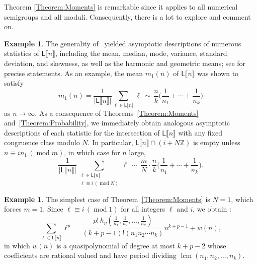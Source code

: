 \documentclass[10pt,reqno]{amsart}
\newcommand{\ZZ}{\mathbb{Z}}
\newcommand{\Le}{\mathsf{L}}
\newcommand{\lcm}{\operatorname{lcm}}
\providecommand{\multi}[1]{\llbracket #1 \rrbracket}
\newcommand{\0}{\color{lightgray}0}
\renewcommand{\pmod}[1]{\,(\operatorname{mod} #1)}
\renewcommand\>{\rangle}
\newcommand\<{\langle}
\theoremstyle{plain}
\theoremstyle{definition}
\newtheorem{Example}[equation]{Example}
\begin{document}
Theorem \ref{Theorem:Moments} is remarkable since it applies to all numerical semigroups
and all moduli.  Consequently, there is a lot to explore and comment on.

\begin{Example}
The generality of~\cite[Thm.~1 and~2]{GOOY} yielded asymptotic descriptions of numerous statistics of $\Le\multi{n}$, including the mean, median, mode, variance, standard deviation, and skewness, as well as the harmonic and geometric means; see \cite[Section~2.1]{GOOY} for precise statements.  As an example, the mean $m_1(n)$ of $\Le\multi{n}$ was shown to satisfy
\begin{equation*}
m_1(n) = \frac{1}{|\Le\multi{n}|}\sum_{\ell \in \Le\multi{n}} \ell
\,\sim\,
\frac{n}{k}\bigg(\frac{1}{n_1} + \cdots + \frac{1}{n_k}\bigg)
\end{equation*}
as $n \to \infty$.  
As a consequence of Theorems~\ref{Theorem:Moments} and~\ref{Theorem:Probability}, we immediately obtain analogous asymptotic descriptions of each statistic for the intersection of $\Le\multi{n}$ with any fixed congruence class modulo $N$.  In particular, $\Le\multi{n} \cap (i + N\ZZ)$ is empty unless $n \equiv in_1 \pmod m$, in which case for $n$ large,
\begin{equation*}
\frac{1}{|\Le\multi{n}|}\sum_{\substack{\ell \in \Le\multi{n} \\ \ell \equiv i \pmod{N}}} \ell
\,\sim\,
\frac{m}{N} \cdot \frac{n}{k}\bigg(\frac{1}{n_1} + \cdots + \frac{1}{n_k}\bigg).
\end{equation*}
\end{Example}

\begin{Example}
The simplest case of Theorem~\ref{Theorem:Moments} is $N = 1$, which forces $m=1$.  Since $\ell \equiv i \pmod{1}$ for all 
integers $\ell$ and $i$, we obtain \cite[Thm.~2]{GOOY}:
\begin{equation}\label{eq:GOOY}
\sum_{\ell \in \Le\multi{n}} \ell^p = 
 \dfrac{p! \, h_p ( \frac{1}{n_1}, \frac{1}{n_2}, \ldots, \frac{1}{n_k} )}{(k + p - 1)! (n_1 n_2 \cdots n_k)}  n^{k+p-1} + w(n),
\end{equation}
in which $w(n)$ is a quasipolynomial of degree at most $k+p-2$ whose coefficients are rational valued and have period dividing $\lcm(n_1,n_2,\ldots,n_k)$.
\end{Example}
\end{document}
